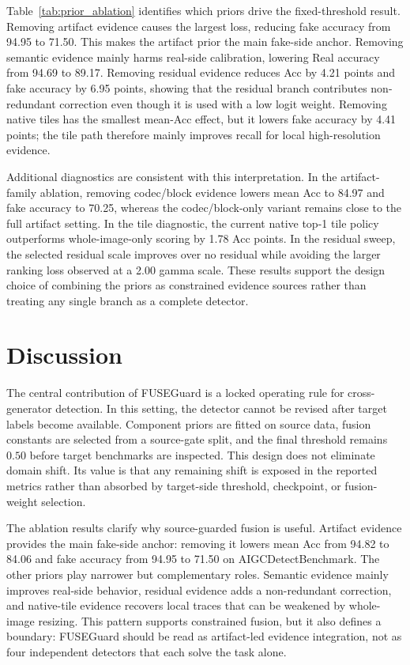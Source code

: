 \documentclass[lettersize,journal]{IEEEtran}
\begin{document}
Table~\ref{tab:prior_ablation} identifies which priors drive the fixed-threshold result. Removing artifact evidence causes the largest loss, reducing fake accuracy from 94.95 to 71.50. This makes the artifact prior the main fake-side anchor. Removing semantic evidence mainly harms real-side calibration, lowering Real accuracy from 94.69 to 89.17. Removing residual evidence reduces Acc by 4.21 points and fake accuracy by 6.95 points, showing that the residual branch contributes non-redundant correction even though it is used with a low logit weight. Removing native tiles has the smallest mean-Acc effect, but it lowers fake accuracy by 4.41 points; the tile path therefore mainly improves recall for local high-resolution evidence.

Additional diagnostics are consistent with this interpretation. In the artifact-family ablation, removing codec/block evidence lowers mean Acc to 84.97 and fake accuracy to 70.25, whereas the codec/block-only variant remains close to the full artifact setting. In the tile diagnostic, the current native top-1 tile policy outperforms whole-image-only scoring by 1.78 Acc points. In the residual sweep, the selected residual scale improves over no residual while avoiding the larger ranking loss observed at a 2.00 gamma scale. These results support the design choice of combining the priors as constrained evidence sources rather than treating any single branch as a complete detector.

\section{Discussion}
\label{sec:discussion}

The central contribution of FUSEGuard is a locked operating rule for cross-generator detection. In this setting, the detector cannot be revised after target labels become available. Component priors are fitted on source data, fusion constants are selected from a source-gate split, and the final threshold remains $0.50$ before target benchmarks are inspected. This design does not eliminate domain shift. Its value is that any remaining shift is exposed in the reported metrics rather than absorbed by target-side threshold, checkpoint, or fusion-weight selection.

The ablation results clarify why source-guarded fusion is useful. Artifact evidence provides the main fake-side anchor: removing it lowers mean Acc from 94.82 to 84.06 and fake accuracy from 94.95 to 71.50 on AIGCDetectBenchmark. The other priors play narrower but complementary roles. Semantic evidence mainly improves real-side behavior, residual evidence adds a non-redundant correction, and native-tile evidence recovers local traces that can be weakened by whole-image resizing. This pattern supports constrained fusion, but it also defines a boundary: FUSEGuard should be read as artifact-led evidence integration, not as four independent detectors that each solve the task alone.
\end{document}
